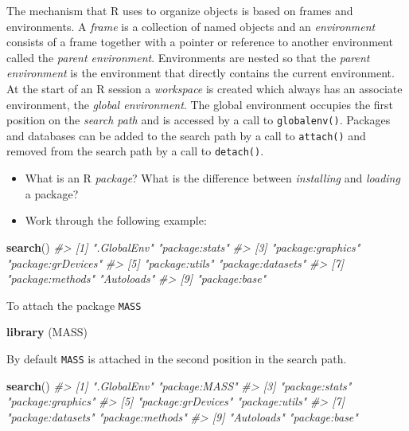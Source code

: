 \documentclass[
]{book}
\newenvironment{Shaded}{\begin{snugshade}}{\end{snugshade}}
\newcommand{\CommentTok}[1]{\textcolor[rgb]{0.56,0.35,0.01}{\textit{#1}}}
\newcommand{\FunctionTok}[1]{\textcolor[rgb]{0.13,0.29,0.53}{\textbf{#1}}}
\newcommand{\NormalTok}[1]{#1}
\providecommand{\tightlist}{%
  \setlength{\itemsep}{0pt}\setlength{\parskip}{0pt}}
\begin{document}
The mechanism that R uses to organize objects is based on frames and environments. A \emph{{frame}} is a collection of named objects and an \emph{{environment}} consists of a frame together with a pointer or reference to another environment called the \emph{{parent environment}}. Environments are nested so that the \emph{{parent environment}} is the environment that directly contains the current environment. At the start of an R session a \emph{{workspace}} is created which always has an associate environment, the \emph{{global environment}}. The global environment occupies the first position on the \emph{{search path}} and is accessed by a call to \texttt{globalenv()}. Packages and databases can be added to the search path by a call to \texttt{attach()} and removed from the search path by a call to \texttt{detach()}.

\begin{itemize}
\tightlist
\item
  What is an R \emph{{package}}? What is the difference between \emph{{installing}} and \emph{{loading}} a package?
\item
  Work through the following example:
\end{itemize}

\begin{Shaded}
\begin{Highlighting}[]
\FunctionTok{search}\NormalTok{()}
\CommentTok{\#\textgreater{} [1] ".GlobalEnv"        "package:stats"    }
\CommentTok{\#\textgreater{} [3] "package:graphics"  "package:grDevices"}
\CommentTok{\#\textgreater{} [5] "package:utils"     "package:datasets" }
\CommentTok{\#\textgreater{} [7] "package:methods"   "Autoloads"        }
\CommentTok{\#\textgreater{} [9] "package:base"}
\end{Highlighting}
\end{Shaded}

To attach the package \texttt{MASS}

\begin{Shaded}
\begin{Highlighting}[]
\FunctionTok{library}\NormalTok{ (MASS)}
\end{Highlighting}
\end{Shaded}

By default \texttt{MASS} is attached in the second position in the search path.

\begin{Shaded}
\begin{Highlighting}[]
\FunctionTok{search}\NormalTok{()}
\CommentTok{\#\textgreater{}  [1] ".GlobalEnv"        "package:MASS"     }
\CommentTok{\#\textgreater{}  [3] "package:stats"     "package:graphics" }
\CommentTok{\#\textgreater{}  [5] "package:grDevices" "package:utils"    }
\CommentTok{\#\textgreater{}  [7] "package:datasets"  "package:methods"  }
\CommentTok{\#\textgreater{}  [9] "Autoloads"         "package:base"}
\end{Highlighting}
\end{Shaded}
\end{document}
